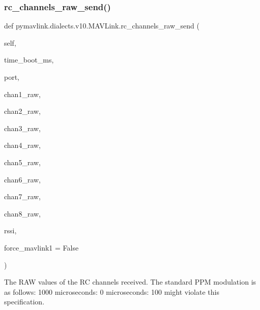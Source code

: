 \begin{DoxyVerb}
\begin{DoxyVerb}
\begin{DoxyVerb}
\begin{DoxyVerb}
\begin{DoxyVerb}
\begin{DoxyVerb}
\subsubsection{\texorpdfstring{rc\+\_\+channels\+\_\+raw\+\_\+send()}{rc\_channels\_raw\_send()}}
{\footnotesize\ttfamily def pymavlink.\+dialects.\+v10.\+M\+A\+V\+Link.\+rc\+\_\+channels\+\_\+raw\+\_\+send (\begin{DoxyParamCaption}\item[{}]{self,  }\item[{}]{time\+\_\+boot\+\_\+ms,  }\item[{}]{port,  }\item[{}]{chan1\+\_\+raw,  }\item[{}]{chan2\+\_\+raw,  }\item[{}]{chan3\+\_\+raw,  }\item[{}]{chan4\+\_\+raw,  }\item[{}]{chan5\+\_\+raw,  }\item[{}]{chan6\+\_\+raw,  }\item[{}]{chan7\+\_\+raw,  }\item[{}]{chan8\+\_\+raw,  }\item[{}]{rssi,  }\item[{}]{force\+\_\+mavlink1 = {\ttfamily False} }\end{DoxyParamCaption})}

\begin{DoxyVerb}The RAW values of the RC channels received. The standard PPM
modulation is as follows: 1000 microseconds: 0%
microseconds: 100%
might violate this specification.


\end{DoxyVerb}
\end{DoxyVerb}
\end{DoxyVerb}
\end{DoxyVerb}
\end{DoxyVerb}
\end{DoxyVerb}
\end{DoxyVerb}
